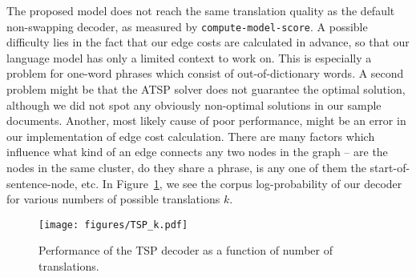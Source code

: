 The proposed model does not reach the same translation quality as the
default non-swapping decoder, as measured by \texttt{compute-model-score}.
A possible difficulty lies in the fact that our edge costs are calculated in
advance, so that our language model has only a limited context to work on.
This is especially a problem for one-word phrases which consist of
out-of-dictionary words. A second problem might be that the \textsc{ATSP}
solver does not guarantee the optimal solution, although we did not spot any
obviously non-optimal solutions in our sample documents.
Another, most likely cause of poor performance, might be an error in our implementation 
of edge cost calculation. There are many factors which influence what kind of an edge connects 
any two nodes in the graph -- are the nodes in the same cluster, do they share a phrase, is any 
one of them the start-of-sentence-node, etc.
In Figure~\ref{decode3}, we see the corpus log-probability of our decoder for
various numbers of possible translations $k$.

\begin{figure}
	\centering
	\texttt{[image: figures/TSP\_k.pdf]}
	\caption{Performance of the TSP decoder as a function of number of translations.}\label{decode3}
\end{figure}

